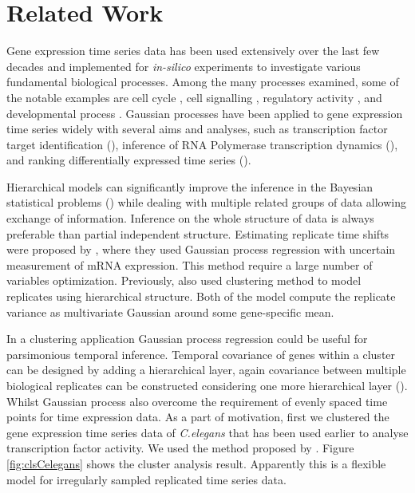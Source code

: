 \section{Related Work}
Gene expression time series data has been used extensively over the last few decades and implemented for \textit {in-silico} experiments to investigate various fundamental biological processes. Among the many processes examined, some of the notable examples are cell cycle \cite{Spellman:1998}, cell signalling \cite{Barenco:2006}, regulatory activity \cite{Sanguinetti:2006}, and developmental process \cite{Tomancak:2002}. Gaussian processes have been applied to gene expression time series widely with several aims and analyses, such as transcription factor target identification (\cite{Honkela:2010}), inference of RNA Polymerase transcription dynamics (\cite{Maina:2014}), and ranking differentially expressed time series (\cite{Kalaitzis:2011}).

Hierarchical models can significantly improve the inference in the Bayesian statistical problems (\cite{Gelman:2004}) while dealing with multiple related groups of data allowing exchange of information. Inference on the whole structure of data is always preferable than partial independent structure. Estimating replicate time shifts were proposed by \cite{Liu:2010}, where they used Gaussian process regression with uncertain measurement of mRNA expression. This method require a large number of variables optimization. Previously, \cite{Ng:2006} also \cite{Medvedovic:2004} used clustering method to model replicates using hierarchical structure. Both of the model compute the replicate variance as multivariate Gaussian around some gene-specific mean.

In a clustering application Gaussian process regression could be useful for parsimonious temporal inference. Temporal covariance of genes within a cluster can be designed by adding a hierarchical layer, again covariance between multiple biological replicates can be constructed considering one more hierarchical layer (\cite{Menzefricke:2000, Hensman:2013}). Whilst Gaussian process also overcome the requirement of evenly spaced time points for time expression data. As a part of motivation, first we clustered the gene expression time series data of \textit{C.elegans} that has been used earlier to analyse transcription factor activity. We used the method proposed by \cite{Hensman:2013}. Figure \ref{fig:clsCelegans} shows the cluster analysis result. Apparently this is a flexible model for irregularly sampled replicated time series data.


